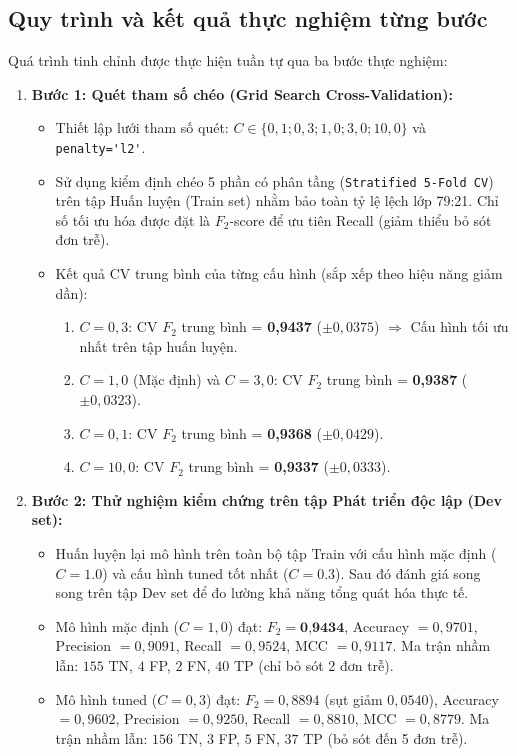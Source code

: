 \documentclass[12pt,a4paper,oneside]{report}
\newcommand{\code}[1]{\nolinkurl{#1}}
\begin{document}
\subsection{Quy trình và kết quả thực nghiệm từng bước}

Quá trình tinh chỉnh được thực hiện tuần tự qua ba bước thực nghiệm:

\begin{enumerate}
    \item \textbf{Bước 1: Quét tham số chéo (Grid Search Cross-Validation):}
    \begin{itemize}
        \item Thiết lập lưới tham số quét: $C \in \{0{,}1; 0{,}3; 1{,}0; 3{,}0; 10{,}0\}$ và \code{penalty='l2'}.
        \item Sử dụng kiểm định chéo 5 phần có phân tầng (\code{Stratified 5-Fold CV}) trên tập Huấn luyện (Train set) nhằm bảo toàn tỷ lệ lệch lớp 79:21. Chỉ số tối ưu hóa được đặt là $F_2$-score để ưu tiên Recall (giảm thiểu bỏ sót đơn trễ).
        \item Kết quả CV trung bình của từng cấu hình (sắp xếp theo hiệu năng giảm dần):
        \begin{enumerate}
            \item $C=0{,}3$: CV $F_2$ trung bình = \textbf{0,9437} ($\pm 0{,}0375$) $\Rightarrow$ Cấu hình tối ưu nhất trên tập huấn luyện.
            \item $C=1{,}0$ (Mặc định) và $C=3{,}0$: CV $F_2$ trung bình = \textbf{0,9387} ($\pm 0{,}0323$).
            \item $C=0{,}1$: CV $F_2$ trung bình = \textbf{0,9368} ($\pm 0{,}0429$).
            \item $C=10{,}0$: CV $F_2$ trung bình = \textbf{0,9337} ($\pm 0{,}0333$).
        \end{enumerate}
    \end{itemize}

    \item \textbf{Bước 2: Thử nghiệm kiểm chứng trên tập Phát triển độc lập (Dev set):}
    \begin{itemize}
        \item Huấn luyện lại mô hình trên toàn bộ tập Train với cấu hình mặc định ($C=1.0$) và cấu hình tuned tốt nhất ($C=0.3$). Sau đó đánh giá song song trên tập Dev set để đo lường khả năng tổng quát hóa thực tế.
        \item Mô hình mặc định ($C=1{,}0$) đạt: $F_2 = \textbf{0,9434}$, Accuracy $= 0{,}9701$, Precision $= 0{,}9091$, Recall $= 0{,}9524$, MCC $= 0{,}9117$. Ma trận nhầm lẫn: $155$ TN, $4$ FP, $2$ FN, $40$ TP (chỉ bỏ sót 2 đơn trễ).
        \item Mô hình tuned ($C=0{,}3$) đạt: $F_2 = 0{,}8894$ (sụt giảm $0{,}0540$), Accuracy $= 0{,}9602$, Precision $= 0{,}9250$, Recall $= 0{,}8810$, MCC $= 0{,}8779$. Ma trận nhầm lẫn: $156$ TN, $3$ FP, $5$ FN, $37$ TP (bỏ sót đến 5 đơn trễ).
    \end{itemize}


\end{enumerate}
\end{document}
